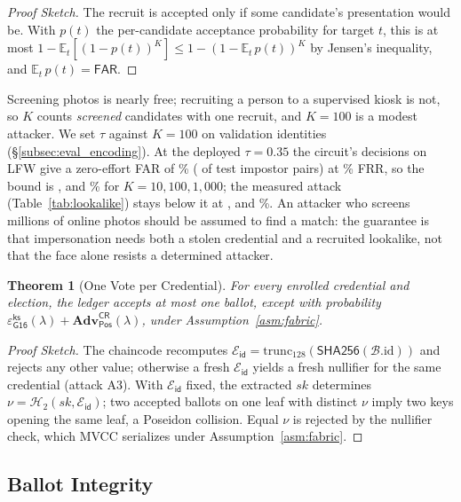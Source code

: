 \documentclass[10pt,letterpaper,journal]{IEEEtran}
\newtheorem{theorem}{Theorem}[section]
\begin{document}
\begin{proof}[Proof Sketch]
The recruit is accepted only if some candidate's presentation would be. With $p(t)$ the per-candidate acceptance probability for target $t$, this is at most $1 - \mathbb{E}_t[(1-p(t))^K] \le 1 - (1 - \mathbb{E}_t\,p(t))^K$ by Jensen's inequality, and $\mathbb{E}_t\,p(t) = \mathsf{FAR}$.
\end{proof}

Screening photos is nearly free; recruiting a person to a supervised kiosk is not, so $K$ counts \emph{screened} candidates with one recruit, and $K = 100$ is a modest attacker. We set $\tau$ against $K = 100$ on validation identities (\S\ref{subsec:eval_encoding}). At the deployed $\tau = 0.35$ the circuit's decisions on LFW give a zero-effort FAR of \nFar\% (\nFalseAccepts{} of \nImpostorPairs{} test impostor pairs) at \nFrr\% FRR, so the bound is \nLookBoundTen, \nLookBoundHundred{} and \nLookBoundThousand\% for $K = 10, 100, 1{,}000$; the measured attack (Table~\ref{tab:lookalike}) stays below it at \nLookLfwTen, \nLookLfwHundred{} and \nLookLfwThousand\%. An attacker who screens millions of online photos should be assumed to find a match: the guarantee is that impersonation needs both a stolen credential and a recruited lookalike, not that the face alone resists a determined attacker.

\begin{theorem}[One Vote per Credential]
\label{thm:antireplay}
For every enrolled credential and election, the ledger accepts at most one ballot, except with probability $\varepsilon^{\mathsf{ks}}_{\mathsf{G16}}(\lambda) + \mathbf{Adv}^{\mathsf{CR}}_{\mathsf{Pos}}(\lambda)$, under Assumption~\ref{asm:fabric}.
\end{theorem}

\begin{proof}[Proof Sketch]
The chaincode recomputes $\mathcal{E}_{\mathsf{id}} = \mathrm{trunc}_{128}(\mathsf{SHA256}(\mathcal{B}.\mathrm{id}))$ and rejects any other value; otherwise a fresh $\mathcal{E}_{\mathsf{id}}$ yields a fresh nullifier for the same credential (attack A3). With $\mathcal{E}_{\mathsf{id}}$ fixed, the extracted $sk$ determines $\nu = \mathcal{H}_2(sk, \mathcal{E}_{\mathsf{id}})$; two accepted ballots on one leaf with distinct $\nu$ imply two keys opening the same leaf, a Poseidon collision. Equal $\nu$ is rejected by the nullifier check, which MVCC serializes under Assumption~\ref{asm:fabric}.
\end{proof}

\subsection{Ballot Integrity}
\label{sec:integrity}
\end{document}
